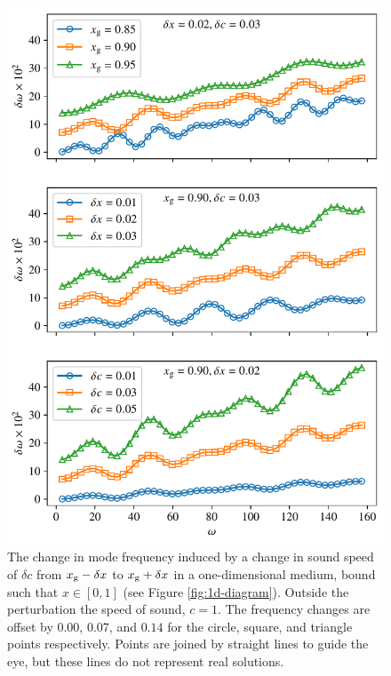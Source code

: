 \begin{figure}
    \centering
    \includegraphics{figures/glitch-1d-example-results.pdf}
    \caption[The change in mode frequency induced by a rapid change in sound speed for the 1D example.]{The change in mode frequency induced by a change in sound speed of \(\delta c\) from \(x_{{\mathrm{g}}} - \delta x\) to \(x_{{\mathrm{g}}} + \delta x\) in a one-dimensional medium, bound such that \(x \in [0, 1]\) (see Figure \ref{fig:1d-diagram}). Outside the perturbation the speed of sound, \(c=1\). The frequency changes are offset by \(0.00\), \(0.07\), and \(0.14\) for the circle, square, and triangle points respectively. Points are joined by straight lines to guide the eye, but these lines do not represent real solutions.
    }
    \label{fig:1d-results}
\end{figure}

